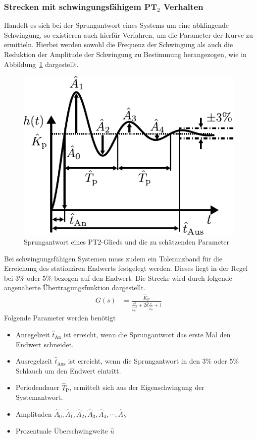 \subsubsection{Strecken mit schwingungsfähigem PT$_{2}$ Verhalten}
%
Handelt es sich bei der Sprungantwort eines Systems um eine abklingende Schwingung, so existieren auch hierfür Verfahren, um die Parameter der Kurve zu ermitteln. Hierbei werden sowohl die Frequenz der Schwingung als auch die Reduktion der Amplitude der Schwingung zu Bestimmung herangezogen, wie in Abbildung~\ref{fig:experimpt2} dargestellt.
%
\begin{figure}[ht!]
	\centering
	\includegraphics[width=0.55\linewidth]{Abbildungen/Modellbildung/PDF/ExperimentelPT2.pdf}
	\caption{Sprungantwort eines PT2-Glieds und die zu schätzenden Parameter \cite{Foellinger94}}
	\label{fig:experimpt2}
\end{figure}
%
Bei schwingungsfähigen Systemen muss zudem ein Toleranzband für die Erreichung des stationären Endwerts festgelegt werden. Dieses liegt in der Regel bei $3\%$ oder $5\%$ bezogen auf den Endwert. Die Strecke wird durch folgende angenäherte Übertragungsfunktion dargestellt.
%
\begin{equation*}
\begin{aligned}
%
G(s)&=\frac{\hat{K}_{\text{P}}}{\frac{s^{2}}{\hat{\omega_{0}}^{2}}+2\hat{d}\frac{s}{\hat{\omega_{0}}}+1}%
%
\end{aligned}
\end{equation*}
%
Folgende Parameter werden benötigt
%
\begin{itemize}
	\item Anregelzeit $\hat{t}_{\text{An}}$ ist erreicht, wenn die Sprungantwort das erste Mal den Endwert schneidet. 
	\item Ausregelzeit $\hat{t}_{\text{Aus}}$ ist erreicht, wenn die Sprungantwort in den $3\%$ oder $5\%$ Schlauch um den Endwert eintritt.
	\item Periodendauer $\hat{T}_{\text{P}}$, ermittelt sich aus der Eigenschwingung der Systemantwort.
	\item Amplituden $\hat{A}_{0},\hat{A}_{1},\hat{A}_{2},\hat{A}_{3},\hat{A}_{4},\cdots,\hat{A}_{\text{N}}$
	\item Prozentuale Überschwingweite $\hat{u}$
\end{itemize}
